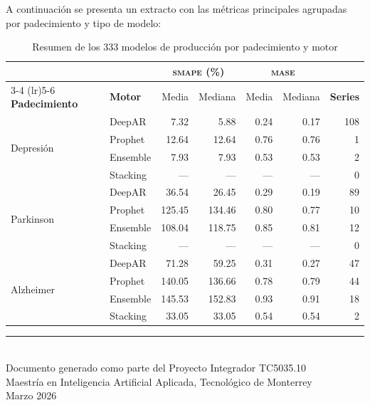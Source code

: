 \documentclass[12pt, letterpaper]{article}
\newcommand{\smape}{\textnormal{\textsc{smape}}}
\newcommand{\mase}{\textnormal{\textsc{mase}}}
\begin{document}
A continuación se presenta un extracto con las métricas principales agrupadas por padecimiento y tipo de modelo:

\begin{table}[H]
\centering
\caption{Resumen de los 333 modelos de producción por padecimiento y motor}
\label{tab:resumen_333}
\scriptsize
\setlength{\tabcolsep}{3pt}
\begin{tabularx}{\textwidth}{X l rr rr r}
\toprule
& & \multicolumn{2}{c}{\smape{} (\%)} & \multicolumn{2}{c}{\mase{}} & \\
\cmidrule(lr){3-4} \cmidrule(lr){5-6}
\textbf{Padecimiento} & \textbf{Motor} & Media & Mediana & Media & Mediana & \textbf{Series} \\
\midrule
\multirow{4}{*}{Depresión} & DeepAR & 7.32 & 5.88 & 0.24 & 0.17 & 108 \\
& Prophet & 12.64 & 12.64 & 0.76 & 0.76 & 1 \\
& Ensemble & 7.93 & 7.93 & 0.53 & 0.53 & 2 \\
& Stacking & --- & --- & --- & --- & 0 \\
\midrule
\multirow{4}{*}{Parkinson} & DeepAR & 36.54 & 26.45 & 0.29 & 0.19 & 89 \\
& Prophet & 125.45 & 134.46 & 0.80 & 0.77 & 10 \\
& Ensemble & 108.04 & 118.75 & 0.85 & 0.81 & 12 \\
& Stacking & --- & --- & --- & --- & 0 \\
\midrule
\multirow{4}{*}{Alzheimer} & DeepAR & 71.28 & 59.25 & 0.31 & 0.27 & 47 \\
& Prophet & 140.05 & 136.66 & 0.78 & 0.79 & 44 \\
& Ensemble & 145.53 & 152.83 & 0.93 & 0.91 & 18 \\
& Stacking & 33.05 & 33.05 & 0.54 & 0.54 & 2 \\
\bottomrule
\end{tabularx}
\end{table}

\vspace{1cm}

\begin{center}
\textcolor{coolgray}{\rule{0.5\textwidth}{0.4pt}}\\[0.3cm]
{\small\textcolor{coolgray}{Documento generado como parte del Proyecto Integrador TC5035.10}}\\
{\small\textcolor{coolgray}{Maestría en Inteligencia Artificial Aplicada, Tecnológico de Monterrey}}\\
{\small\textcolor{coolgray}{Marzo 2026}}
\end{center}
\end{document}
